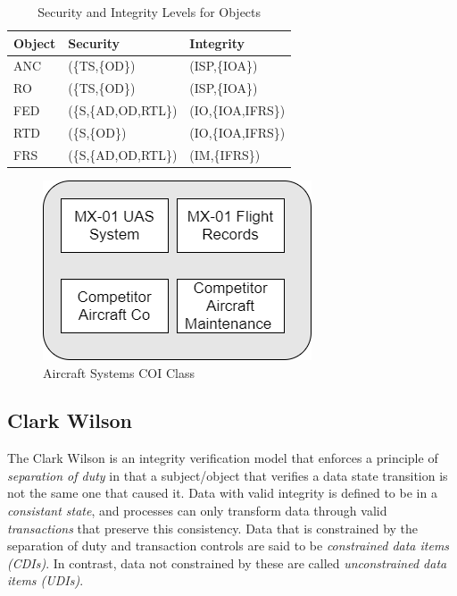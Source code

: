 \documentclass[10pt,journal,compsoc]{IEEEtran}
\begin{document}
\begin{table}[]
  \caption{Security and Integrity Levels for Objects}
  \label{tab:security-integrity-objects}
  \centering
  \begin{tabular}{lll}
  \hline
  \textbf{Object} & \textbf{Security} & \textbf{Integrity}   \\
  \hline
  ANC             & (\{TS,\{OD\})       & (ISP,\{IOA\})      \\
  RO              & (\{TS,\{OD\})       & (ISP,\{IOA\})      \\
  FED             & (\{S,\{AD,OD,RTL\}) & (IO,\{IOA,IFRS\})  \\ 
  RTD             & (\{S,\{OD\})        & (IO,\{IOA,IFRS\})  \\
  FRS             & (\{S,\{AD,OD,RTL\}) & (IM,\{IFRS\})  
  \end{tabular}
\end{table}

\begin{figure}[t]
  \caption{Aircraft Systems COI Class} 
  \includegraphics[scale=0.5]{COI_Classes.png}
\end{figure}

\subsection{Clark Wilson}

The Clark Wilson is an integrity verification model that enforces a principle of \textit{separation of duty} in that a subject/object that verifies a data state transition is not the same one that caused it. Data with valid integrity is defined to be in a \textit{consistant state}, and processes can only transform data through valid \textit{transactions} that preserve this consistency. Data that is constrained by the separation of duty and transaction controls are said to be \textit{constrained data items (CDIs)}. In contrast, data not constrained by these are called \textit{unconstrained data items (UDIs)}. 
\end{document}
